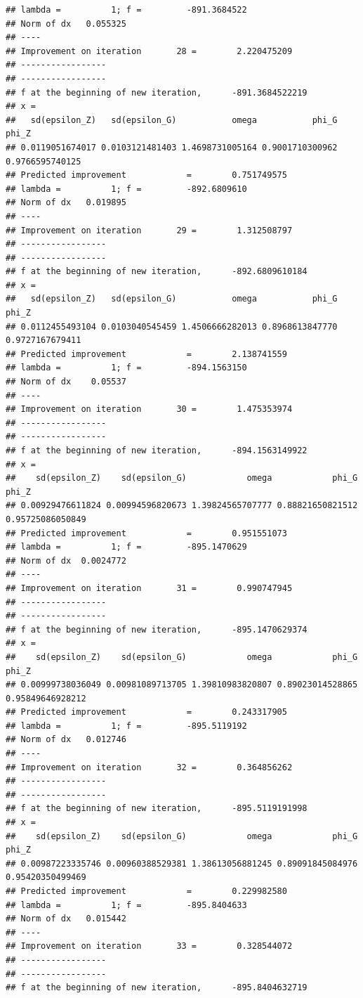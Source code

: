 \documentclass[12pt,a4paper,]{article}
\newcommand{\0}{\mathbf{0}}
\begin{document}
\begin{verbatim}
## lambda =          1; f =         -891.3684522 
## Norm of dx   0.055325
## ----
## Improvement on iteration       28 =        2.220475209
## -----------------
## -----------------
## f at the beginning of new iteration,      -891.3684522219 
## x =
##   sd(epsilon_Z)   sd(epsilon_G)           omega           phi_G           phi_Z 
## 0.0119051674017 0.0103121481403 1.4698731005164 0.9001710300962 0.9766595740125 
## Predicted improvement            =        0.751749575
## lambda =          1; f =         -892.6809610 
## Norm of dx   0.019895
## ----
## Improvement on iteration       29 =        1.312508797
## -----------------
## -----------------
## f at the beginning of new iteration,      -892.6809610184 
## x =
##   sd(epsilon_Z)   sd(epsilon_G)           omega           phi_G           phi_Z 
## 0.0112455493104 0.0103040545459 1.4506666282013 0.8968613847770 0.9727167679411 
## Predicted improvement            =        2.138741559
## lambda =          1; f =         -894.1563150 
## Norm of dx    0.05537
## ----
## Improvement on iteration       30 =        1.475353974
## -----------------
## -----------------
## f at the beginning of new iteration,      -894.1563149922 
## x =
##    sd(epsilon_Z)    sd(epsilon_G)            omega            phi_G            phi_Z 
## 0.00929476611824 0.00994596820673 1.39824565707777 0.88821650821512 0.95725086050849 
## Predicted improvement            =        0.951551073
## lambda =          1; f =         -895.1470629 
## Norm of dx  0.0024772
## ----
## Improvement on iteration       31 =        0.990747945
## -----------------
## -----------------
## f at the beginning of new iteration,      -895.1470629374 
## x =
##    sd(epsilon_Z)    sd(epsilon_G)            omega            phi_G            phi_Z 
## 0.00999738036049 0.00981089713705 1.39810983820807 0.89023014528865 0.95849646928212 
## Predicted improvement            =        0.243317905
## lambda =          1; f =         -895.5119192 
## Norm of dx   0.012746
## ----
## Improvement on iteration       32 =        0.364856262
## -----------------
## -----------------
## f at the beginning of new iteration,      -895.5119191998 
## x =
##    sd(epsilon_Z)    sd(epsilon_G)            omega            phi_G            phi_Z 
## 0.00987223335746 0.00960388529381 1.38613056881245 0.89091845084976 0.95420350499469 
## Predicted improvement            =        0.229982580
## lambda =          1; f =         -895.8404633 
## Norm of dx   0.015442
## ----
## Improvement on iteration       33 =        0.328544072
## -----------------
## -----------------
## f at the beginning of new iteration,      -895.8404632719 

\end{verbatim}
\end{document}
